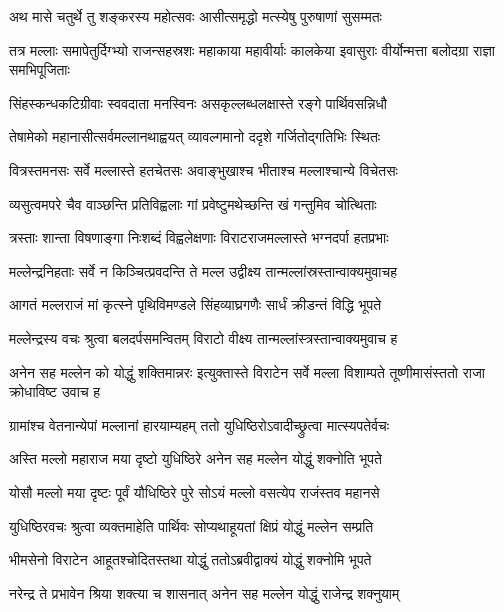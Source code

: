 \twolineshloka
{अथ मासे चतुर्थे तु शङ्करस्य महोत्सवः}
{आसीत्समृद्धो मत्स्येषु पुरुषाणां सुसम्मतः}


\onelineshloka
{तत्र मल्लाः समापेतुर्दिग्भ्यो राजन्सहस्रशः}
\twolineshloka
{महाकाया महावीर्याः कालकेया इवासुराः}
{वीर्योन्मत्ता बलोदग्रा राज्ञा समभिपूजिताः}


\twolineshloka
{सिंहस्कन्धकटिग्रीवाः स्ववदाता मनस्विनः}
{असकृल्लब्धलक्षास्ते रङ्गे पार्थिवसन्निधौ}


\twolineshloka
{तेषामेको महानासीत्सर्वमल्लानथाह्वयत्}
{व्यावल्गमानो ददृशे गर्जितोद्गतिभिः स्थितः}


\twolineshloka
{वित्रस्तमनसः सर्वे मल्लास्ते हतचेतसः}
{अवाङ्भुखाश्च भीताश्च मल्लाश्चान्ये विचेतसः}


\twolineshloka
{व्यसुत्वमपरे चैव वाञ्छन्ति प्रतिविह्वलाः}
{गां प्रवेष्टुमथेच्छन्ति खं गन्तुमिव चोत्थिताः}


\twolineshloka
{त्रस्ताः शान्ता विषणाङ्गा निःशब्दं विह्वलेक्षणाः}
{विराटराजमल्लास्ते भग्नदर्पा हतप्रभाः}


\twolineshloka
{मल्लेन्द्रनिहताः सर्वे न किञ्चित्प्रवदन्ति ते}
{मल्ल उद्वीक्ष्य तान्मल्लांस्रस्तान्वाक्यमुवाचह}


\twolineshloka
{आगतं मल्लराजं मां कृत्स्ने पृथिविमण्डले}
{सिंहव्याघ्रगणैः सार्धं क्रीडन्तं विद्धि भूपते}


\twolineshloka
{मल्लेन्द्रस्य वचः श्रुत्वा बलदर्पसमन्वितम्}
{विराटो वीक्ष्य तान्मल्लांस्त्रस्तान्वाक्यमुवाच ह}


\onelineshloka
{अनेन सह मल्लेन को योद्धुं शक्तिमान्नरः}
\twolineshloka
{इत्युक्तास्ते विराटेन सर्वे मल्ला विशाम्पते}
{तूष्णीमासंस्ततो राजा क्रोधाविष्ट उवाच ह}


\twolineshloka
{ग्रामांश्च वेतनान्येपां मल्लानां हारयाम्यहम्}
{ततो युधिष्ठिरोऽवादीच्छ्रुत्वा मात्स्यपतेर्वचः}


\twolineshloka
{अस्ति मल्लो महाराज मया दृष्टो युधिष्ठिरे}
{अनेन सह मल्लेन योद्धुं शक्नोति भूपते}


\twolineshloka
{योसौ मल्लो मया दृष्टः पूर्वं यौधिष्ठिरे पुरे}
{सोऽयं मल्लो वसत्येप राजंस्तव महानसे}



\twolineshloka
{युधिष्ठिरवचः श्रुत्वा व्यक्तमाहेति पार्थिवः}
{सोप्यथाहूयतां क्षिप्रं योद्धुं मल्लेन सम्प्रति}


\twolineshloka
{भीमसेनो विराटेन आहूतश्चोदितस्तथा}
{योद्धुं ततोऽब्रवीद्वाक्यं योद्धुं शक्नोमि भूपते}


\twolineshloka
{नरेन्द्र ते प्रभावेन श्रिया शक्त्या च शासनात्}
{अनेन सह मल्लेन योद्धुं राजेन्द्र शक्नुयाम्}



